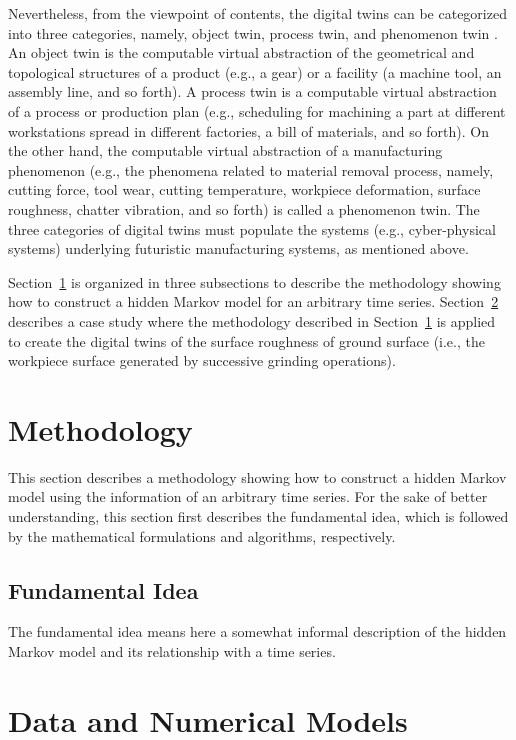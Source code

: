 \documentclass{CUP-JNL-DCE}
\begin{document}
Nevertheless, from the viewpoint of contents, the digital twins can be
categorized into three categories, namely, object twin, process twin, and
phenomenon twin \citep{Ullah2019}. An object twin is the computable virtual
abstraction of the geometrical and topological structures of a product
(e.g., a gear) or a facility (a machine tool, an assembly line, and so
forth). A process twin is a computable virtual abstraction of a process or
production plan (e.g., scheduling for machining a part at different
workstations spread in different factories, a bill of materials, and so
forth). On the other hand, the computable virtual abstraction of a
manufacturing phenomenon (e.g., the phenomena related to material removal
process, namely, cutting force, tool wear, cutting temperature, workpiece
deformation, surface roughness, chatter vibration, and so forth) is called a
phenomenon twin. The three categories of digital twins must populate the
systems (e.g., cyber-physical systems) underlying futuristic manufacturing
systems, as mentioned above.

Section~\ref{sec2} is organized in three subsections to describe the methodology
showing how to construct a hidden Markov model for an arbitrary time series.
Section~\ref{sec3} describes a case study where the methodology described in
Section~\ref{sec2} is applied to create the digital twins of the surface roughness of ground
surface (i.e., the workpiece surface generated by successive grinding
operations).

\section{Methodology}
\label{sec2}

This section describes a methodology showing how to construct a hidden
Markov model using the information of an arbitrary time series. For the sake
of better understanding, this section first describes the fundamental idea,
which is followed by the mathematical formulations and algorithms,
respectively.


\subsection{Fundamental Idea}
\label{sec2.1}

The fundamental idea means here a somewhat informal description of the
hidden Markov model and its relationship with a time series.


\section{Data and Numerical Models}
\label{sec3}
\end{document}
